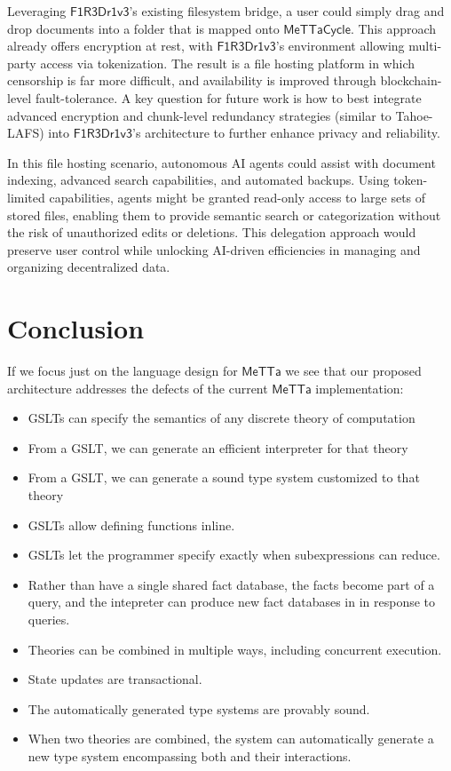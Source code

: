 \documentclass{article}
\newcommand{\MC}{\mathsf{MeTTaCycle}}
\newcommand{\FD}{\mathsf{F1R3Dr1v3}}
\begin{document}
Leveraging $\FD$'s existing filesystem bridge, a user could simply
drag and drop documents into a folder that is mapped onto $\MC$. This
approach already offers encryption at rest, with $\FD$'s environment
allowing multi-party access via tokenization. The result is a file
hosting platform in which censorship is far more difficult, and
availability is improved through blockchain-level fault-tolerance. A
key question for future work is how to best integrate advanced
encryption and chunk-level redundancy strategies (similar to
Tahoe-LAFS) into $\FD$'s architecture to further enhance privacy and
reliability.

In this file hosting scenario, autonomous AI agents could assist with
document indexing, advanced search capabilities, and automated
backups. Using token-limited capabilities, agents might be granted
read-only access to large sets of stored files, enabling them to
provide semantic search or categorization without the risk of
unauthorized edits or deletions. This delegation approach would
preserve user control while unlocking AI-driven efficiencies in
managing and organizing decentralized data.

\section{Conclusion}

If we focus just on the language design for $\mathsf{MeTTa}$ we see
that our proposed architecture addresses the defects of the current
$\mathsf{MeTTa}$ implementation:

\begin{itemize}
    \item GSLTs can specify the semantics of any discrete theory of computation
    \item From a GSLT, we can generate an efficient interpreter for that theory
    \item From a GSLT, we can generate a sound type system customized to that theory
    \item GSLTs allow defining functions inline.
    \item GSLTs let the programmer specify exactly when subexpressions can reduce.
    \item Rather than have a single shared fact database, the facts become part of a query, and the intepreter can produce new fact databases in in response to queries.
    \item Theories can be combined in multiple ways, including concurrent execution.
    \item State updates are transactional.
    \item The automatically generated type systems are provably sound.
    \item When two theories are combined, the system can automatically generate a new type system encompassing both and their interactions.
\end{itemize}
\end{document}
